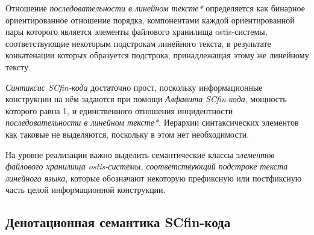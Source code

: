 \begin{SCn}
\end{SCn}

Отношение \textit{последовательности в линейном тексте*} определяется как бинарное ориентированное отношение порядка, компонентами каждой ориентированной пары которого является элементы файлового хранилища ostis-системы, соответствующие некоторым подстрокам линейного текста, в результате конкатенации которых образуется подстрока, принадлежащая этому же линейному тексту.

\textit{Синтаксис SCfin-кода} достаточно прост, поскольку информационные конструкции на нём задаются при помощи \textit{Алфавита SCfin-кода}, мощность которого равна 1, и единственного отношения инцидентности \textit{последовательности в линейном тексте*}. Иерархии синтаксических элементов как таковые не выделяются, поскольку в этом нет необходимости.

На уровне реализации важно выделить семантические классы э\textit{лементов файлового хранилища ostis-системы, соответствующий подстроке текста линейного языка}, которые обозначают некоторую префиксную или постфиксную часть целой информационной конструкции.

\subsection{Денотационная семантика SCfin-кода}
\label{sec_soft_platform_scfin_code_semantic}

\begin{SCn}
\begin{scnsubstruct}

\begin{scnindent}
    \begin{scneqtoset}
    \end{scneqtoset}
\end{scnindent}

\end{scnsubstruct}
\end{SCn}

